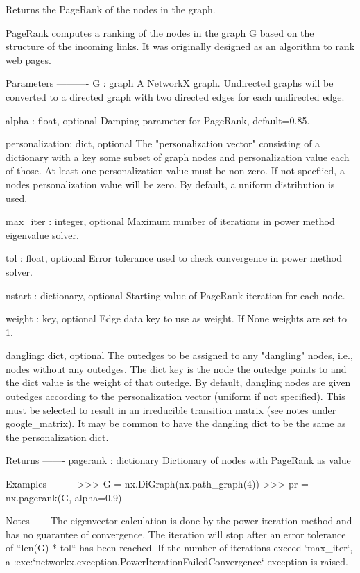 \begin{DoxyVerb}Returns the PageRank of the nodes in the graph.

PageRank computes a ranking of the nodes in the graph G based on
the structure of the incoming links. It was originally designed as
an algorithm to rank web pages.

Parameters
----------
G : graph
  A NetworkX graph.  Undirected graphs will be converted to a directed
  graph with two directed edges for each undirected edge.

alpha : float, optional
  Damping parameter for PageRank, default=0.85.

personalization: dict, optional
  The "personalization vector" consisting of a dictionary with a
  key some subset of graph nodes and personalization value each of those.
  At least one personalization value must be non-zero.
  If not specfiied, a nodes personalization value will be zero.
  By default, a uniform distribution is used.

max_iter : integer, optional
  Maximum number of iterations in power method eigenvalue solver.

tol : float, optional
  Error tolerance used to check convergence in power method solver.

nstart : dictionary, optional
  Starting value of PageRank iteration for each node.

weight : key, optional
  Edge data key to use as weight.  If None weights are set to 1.

dangling: dict, optional
  The outedges to be assigned to any "dangling" nodes, i.e., nodes without
  any outedges. The dict key is the node the outedge points to and the dict
  value is the weight of that outedge. By default, dangling nodes are given
  outedges according to the personalization vector (uniform if not
  specified). This must be selected to result in an irreducible transition
  matrix (see notes under google_matrix). It may be common to have the
  dangling dict to be the same as the personalization dict.


Returns
-------
pagerank : dictionary
   Dictionary of nodes with PageRank as value

Examples
--------
>>> G = nx.DiGraph(nx.path_graph(4))
>>> pr = nx.pagerank(G, alpha=0.9)

Notes
-----
The eigenvector calculation is done by the power iteration method
and has no guarantee of convergence.  The iteration will stop after
an error tolerance of ``len(G) * tol`` has been reached. If the
number of iterations exceed `max_iter`, a
:exc:`networkx.exception.PowerIterationFailedConvergence` exception
is raised.


\end{DoxyVerb}
